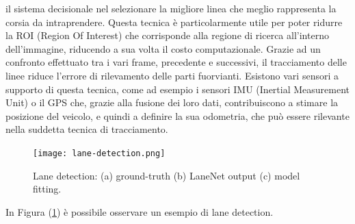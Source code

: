 \begin{enumerate}
    il sistema decisionale nel selezionare la migliore linea che meglio rappresenta 
    la corsia da intraprendere. Questa tecnica è particolarmente 
    utile per poter ridurre la ROI (Region Of Interest) che corrisponde 
    alla regione di ricerca all'interno dell'immagine, riducendo a sua volta 
    il costo computazionale. Grazie ad un confronto effettuato tra i 
    vari frame, precedente e successivi, il tracciamento delle linee riduce 
    l'errore di rilevamento delle parti fuorvianti. Esistono vari sensori a 
    supporto di questa tecnica, come ad esempio i sensori IMU (Inertial 
    Measurement Unit) o il GPS che, grazie alla fusione dei loro dati, 
    contribuiscono a stimare la posizione del veicolo, e quindi a definire 
    la sua odometria, che può essere rilevante nella suddetta tecnica di 
    tracciamento.
\end{enumerate}
\begin{figure}
    \centering
    \texttt{[image: lane-detection.png]}
    \centering
    \caption{Lane detection: (a) ground-truth (b) LaneNet \cite{LaneNet} output (c) model fitting.}
    \label{lane-det}
\end{figure}
In Figura (\ref{lane-det}) è possibile osservare un esempio di lane detection.

